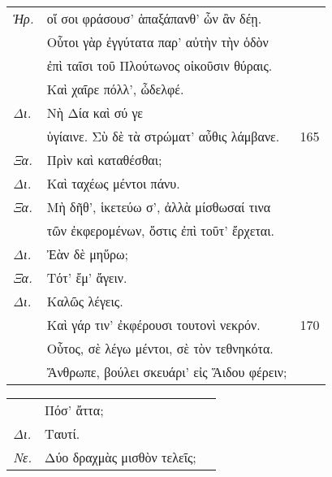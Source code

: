 \documentclass[13pt]{article}
\begin{document}
\begin{greek}
\begin{spacing}{1.5}
\begin{tabularx}{\textwidth}{@{}lXr@{}}
  \textit{Ἡρ.} & οἵ σοι φράσουσ' ἁπαξάπανθ' ὧν ἂν δέῃ. & \\
  & Οὗτοι γὰρ ἐγγύτατα παρ' αὐτὴν τὴν ὁδὸν & \\
  & ἐπὶ ταῖσι τοῦ Πλούτωνος οἰκοῦσιν θύραις. & \\
  & Καὶ χαῖρε πόλλ', ὦδελφέ. & \\
  \textit{Δι.} & \hspace*{10.5em}Νὴ Δία καὶ σύ γε & \\
  & ὑγίαινε. Σὺ δὲ τὰ στρώματ' αὖθις λάμβανε. & 165 \\
  \textit{Ξα.} & Πρὶν καὶ καταθέσθαι; & \\
  \textit{Δι.} & \hspace*{9.5em}Καὶ ταχέως μέντοι πάνυ. & \\
  \textit{Ξα.} & Μὴ δῆθ', ἱκετεύω σ', ἀλλὰ μίσθωσαί τινα & \\
  & τῶν ἐκφερομένων, ὅστις ἐπὶ τοῦτ' ἔρχεται. & \\
  \textit{Δι.} & Ἐὰν δὲ μηὕρω; & \\
  \textit{Ξα.} & \hspace*{6.5em}Τότ' ἔμ' ἄγειν. & \\
  \textit{Δι.} & \hspace*{12.5em}Καλῶς λέγεις. & \\
  & Καὶ γάρ τιν' ἐκφέρουσι τουτονὶ νεκρόν. & 170 \\
  & Οὗτος, σὲ λέγω μέντοι, σὲ τὸν τεθνηκότα. & \\
  & Ἄνθρωπε, βούλει σκευάρι' εἰς Ἅιδου φέρειν; & \\
  \end{tabularx}

  \noindent\textit{\MakeUppercase{}}

\begin{tabularx}{\textwidth}{@{}lXr@{}}
  \phantom{Ξα.} & Πόσ' ἄττα; & \\
  \textit{Δι.} & \hspace*{5em}Ταυτί. & \\
  \textit{Νε.} & \hspace*{8em}Δύο δραχμὰς μισθὸν τελεῖς; & \\
\end{tabularx}

\end{spacing}

\newpage


\end{greek}
\end{document}
